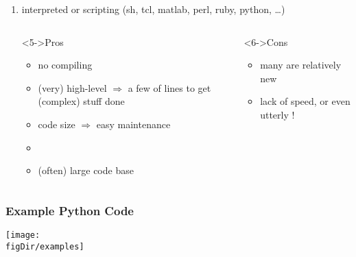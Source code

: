 \documentclass[10pt,t]{beamer}
\def\figDir{figures}
\newcommand{\red}[1]{{\color{red}{#1}}}
\newcommand{\blue}[1]{{\color{blue}{#1}}}
\begin{document}
\begin{frame}
\begin{enumerate}
  \item<4-> interpreted or scripting (sh, tcl, matlab, perl, ruby, python,
    \dots) \vspace*{-5mm}
    \begin{columns}[t]
      \begin{column}{0.52\linewidth}
        \begin{exampleblock}<5->{Pros}
          \begin{itemize}
          \item no compiling
          \item (very) high-level $\Rightarrow$ a few of lines to get (complex)
            stuff done
          \item code size $\Rightarrow$ easy maintenance
          \item \blue{dynamic!}
          \item (often) large code base
          \end{itemize}
        \end{exampleblock}
      \end{column}
      \begin{column}{0.55\linewidth}
        \begin{alertblock}<6->{Cons}
          \begin{itemize}
          \item many are relatively new
          \item lack of speed, or even utterly \red{slow}!
          \end{itemize}
        \end{alertblock}
      \end{column}
    \end{columns}
  \end{enumerate}
\end{frame}

\begin{frame}
  \frametitle{Example Python Code}

  \texttt{[image: \\figDir/examples]}
\end{frame}


\lstset{language=C}
\lstset{language=}
\end{document}
